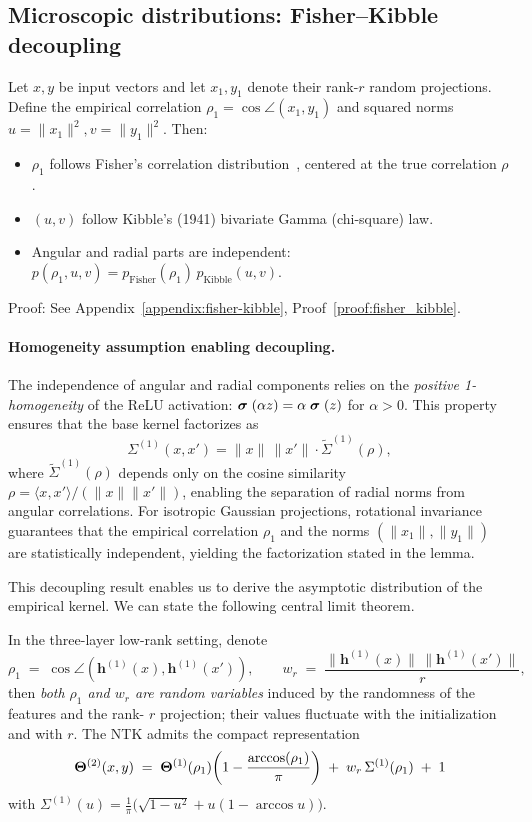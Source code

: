 \subsection{Microscopic distributions: Fisher–Kibble decoupling}
\begin{lemma}\label{lem:fisher-kibble}
Let \(x,y\) be input vectors and let \(x_1,y_1\) denote their rank-\(r\) random projections. Define the empirical correlation \( \rho_1 = \cos\angle(x_1,y_1) \) and squared norms \( u=\|x_1\|^2, v=\|y_1\|^2 \). Then:
\begin{itemize}
    \item \( \rho_1 \) follows Fisher's correlation distribution~\cite{fisher1915probable,hotelling1953new}, centered at the true correlation \( \rho \).
    \item \( (u,v) \) follow Kibble's (1941) bivariate Gamma (chi-square) law.
    \item Angular and radial parts are independent: \( p(\rho_1,u,v) = p_{\text{Fisher}}(\rho_1)\,p_{\text{Kibble}}(u,v) \).
\end{itemize}
\end{lemma}

Proof: See Appendix~\ref{appendix:fisher-kibble}, Proof~\ref{proof:fisher_kibble}.

\paragraph{Homogeneity assumption enabling decoupling.}
The independence of angular and radial components relies on the \emph{positive 1-homogeneity} of the ReLU activation: \( \mathrel{\boldsymbol{\sigma}}(\alpha z) = \alpha \mathrel{\boldsymbol{\sigma}}(z) \) for \( \alpha > 0 \). This property ensures that the base kernel factorizes as
\[
\Sigma^{(1)}(x,x') = \|x\|\,\|x'\| \cdot \tilde{\Sigma}^{(1)}(\rho),
\]
where \( \tilde{\Sigma}^{(1)}(\rho) \) depends only on the cosine similarity \( \rho = \langle x,x'\rangle/(\|x\|\|x'\|) \), enabling the separation of radial norms from angular correlations. For isotropic Gaussian projections, rotational invariance guarantees that the empirical correlation \( \rho_1 \) and the norms \( (\|x_1\|,\|y_1\|) \) are statistically independent, yielding the factorization stated in the lemma.

This decoupling result enables us to derive the asymptotic distribution of the empirical kernel. We can state the following central limit theorem.



In the three-layer low-rank setting, denote
\[
\rho_1 \;=\; \cos\angle(\bm{h}^{(1)}(x),\bm{h}^{(1)}(x')),\qquad w_r \;=\; \frac{\|\bm{h}^{(1)}(x)\|\,\|\bm{h}^{(1)}(x')\|}{r},
\]
then \emph{both \(\rho_1\) and \(w_r\) are random variables} induced by the randomness of the features and the rank-
\(r\) projection; their values fluctuate with the initialization and with \(r\).
The NTK admits the compact representation
\[
\boldsymbol{\Theta}^{(2)}(x,y) \;=\; \boldsymbol{\Theta}^{(1)}(\rho_1)\!\left(1-\frac{\arccos(\rho_1)}{\pi}\right) \;+\; w_r\,\Sigma^{(1)}(\rho_1) \;+\; 1
\]
with \( \Sigma^{(1)}(u) = \frac{1}{\pi}\big(\sqrt{1-u^2}+u(1-\arccos u)\big) \).

